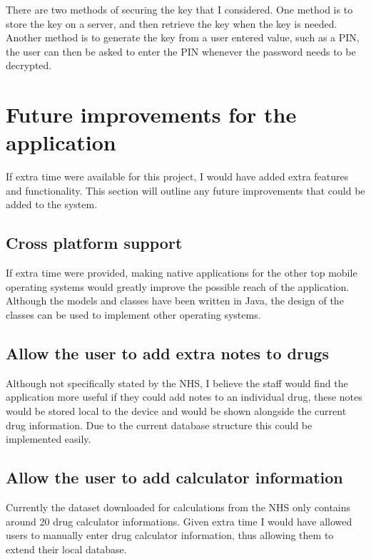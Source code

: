 There are two methods of securing the key that I considered. One method is to store the key on a server, and then retrieve the key when the key is needed. Another method is to generate the key from a user entered value, such as a PIN, the user can then be asked to enter the PIN whenever the password needs to be decrypted.


\section{Future improvements for the application}

If extra time were available for this project, I would have added extra features and functionality. This section will outline any future improvements that could be added to the system.

\subsection{Cross platform support}

If extra time were provided, making native applications for the other top mobile operating systems would greatly improve the possible reach of the application. Although the models and classes have been written in Java, the design of the classes can be used to implement other operating systems. 

\subsection{Allow the user to add extra notes to drugs}

Although not specifically stated by the NHS, I believe the staff would find the application more useful if they could add notes to an individual drug, these notes would be stored local to the device and would be shown alongside the current drug information. Due to the current database structure this could be implemented easily.

\subsection{Allow the user to add calculator information}

Currently the dataset downloaded for calculations from the NHS only contains around 20 drug calculator informations. Given extra time I would have allowed users to manually enter drug calculator information, thus allowing them to extend their local database. 

